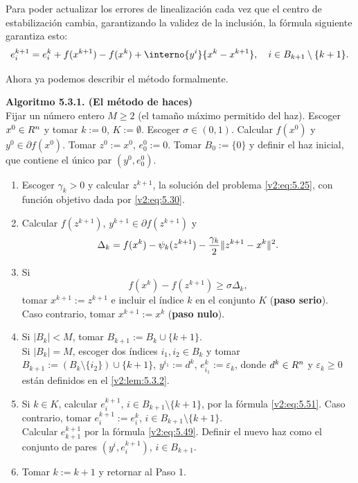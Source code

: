 Para poder actualizar los errores de linealización cada vez que el centro de estabilización cambia, garantizando la validez de la inclusión, la fórmula siguiente garantiza esto:
\begin{equation}
    e_i^{k+1} = e_i^k + f(x^{k+1}) - f(x^k) + \interno{y^i}{x^k - x^{k+1}}, \quad i \in B_{k+1} \setminus \{k+1\}.
    \label{v2:eq:5.51}
\end{equation}

Ahora ya podemos describir el método formalmente.

\vspace{0.3cm}
\noindent \textbf{Algoritmo 5.3.1. (El método de haces)} \\
Fijar un número entero $M \ge 2$ (el tamaño máximo permitido del haz). Escoger $x^0 \in R^n$ y tomar $k := 0$, $K := \emptyset$. Escoger $\sigma \in (0, 1)$. Calcular $f(x^0)$ y $y^0 \in \partial f(x^0)$. Tomar $z^0 := x^0$, $e_0^0 := 0$. Tomar $B_0 := \{0\}$ y definir el haz inicial, que contiene el único par $(y^0, e_0^0)$.
\begin{enumerate}[label=\arabic*., itemsep=0.1cm, topsep=0.1cm]
    \item Escoger $\gamma_k > 0$ y calcular $z^{k+1}$, la solución del problema \eqref{v2:eq:5.25}, con función objetivo dada por \eqref{v2:eq:5.30}.
    \item Calcular $f(z^{k+1})$, $y^{k+1} \in \partial f(z^{k+1})$ y 
    \begin{equation}
        \Delta_k = f(x^k) - \psi_k(z^{k+1}) - \frac{\gamma_k}{2} \lVert z^{k+1} - x^k\rVert^2.
        \label{v2:eq:5.52}
    \end{equation}
    \item Si
    \begin{equation}
        f(x^k) - f(z^{k+1}) \ge \sigma \Delta_k,
        \label{v2:eq:5.53}
    \end{equation}
    tomar $x^{k+1} := z^{k+1}$ e incluir el índice $k$ en el conjunto $K$ (\textbf{paso serio}). \\
    Caso contrario, tomar $x^{k+1} := x^k$ (\textbf{paso nulo}).
    \item Si $|B_k| < M$, tomar $B_{k+1} := B_k \cup \{k+1\}$. \\
    Si $|B_k| = M$, escoger dos índices $i_1, i_2 \in B_k$ y tomar $B_{k+1} := (B_k \setminus \{i_2\}) \cup \{k+1\}$, $y^{i_1} := d^k$, $e_{i_1}^k := \varepsilon_k$, donde $d^k \in R^n$ y $\varepsilon_k \ge 0$ están definidos en el \cref{v2:lem:5.3.2}.
    \item Si $k \in K$, calcular $e_i^{k+1}$, $i \in B_{k+1} \setminus \{k+1\}$, por la fórmula \eqref{v2:eq:5.51}. Caso contrario, tomar $e_i^{k+1} := e_i^k$, $i \in B_{k+1} \setminus \{k+1\}$. \\
    Calcular $e_{k+1}^{k+1}$ por la fórmula \eqref{v2:eq:5.49}. Definir el nuevo haz como el conjunto de pares $(y^i, e_i^{k+1})$, $i \in B_{k+1}$.
    \item Tomar $k := k + 1$ y retornar al Paso 1.
\end{enumerate}
\vspace{0.3cm}

